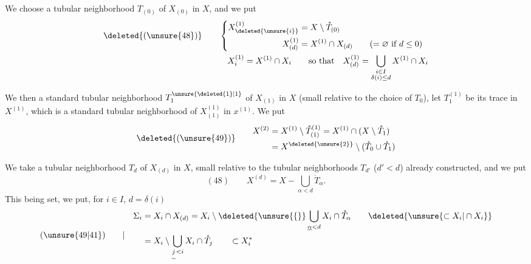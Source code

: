 We choose a  tubular neighborhood $T_{(0)}$ of
$X_{(0)}$ in $X$, and we put
\[
\begin{aligned}
\deleted{(\unsure{48})}\qquad&
\left\{\begin{aligned}
X^{(1)}_{\deleted{\unsure{i}}}&=X\setminus\mathring T_{(0)}\\
X^{(1)}_{(d)}&=X^{(1)}\cap X_{(d)}\qquad(=\varnothing\text{ if }d\leq0)
\end{aligned}\right.\\
&\quad X^{(1)}_i=X^{(1)}\cap X_i
\qquad\text{so that}\quad
X^{(1)}_{(d)}=\bigcup_{\substack{i\in I\\\delta(i)\leq d}}X^{(1)}\cap X_i
\end{aligned}
\]

We then  a standard tubular neighborhood
 $T_1^{\unsure{\deleted{1}|1}}$ of $X_{(1)}$ in $X$
(small relative to the choice of $T_0$), let $T_1^{(1)}$ be its trace in
$X^{(1)}$, which is a standard tubular neighborhood of $X^{(1)}_{(1)}$ in
$x^{(1)}$. We put
\[
\deleted{(\unsure{49})}\qquad
\begin{aligned}
X^{(2)}&=X^{(1)}\setminus\mathring T^{(1)}_{(1)}
=X^{(1)}\cap(X\setminus\mathring T_1)\\
&=X^{\deleted{\unsure{2}}}\setminus(\mathring T_0\cup\mathring T_1)
\end{aligned}
\]

We take a tubular neighborhood $T_d$ of $X_{(d)}$ in $X$,
small relative to the tubular neighborhoods $T_{d'}$ ($d'<d$) already constructed,
and we put
\[
(48)\qquad X^{(d)}=X-\bigcup_{\alpha<d}\mathring T_\alpha.
\]
This being set, we put, for $i\in I$, $d=\delta(i)$
\[
(\unsure{49|41})\qquad|\quad
\begin{aligned}
\Sigma_i&=X_i\cap X_{(d)}
=X_i\setminus\deleted{\unsure{\{}}\bigcup_{\underline{\alpha}<d}X_i\cap
\mathring T_\alpha
\qquad\deleted{\unsure{\subset X_i|\cap X_i}}\\
&=X_i\setminus\bigcup_{\underset{\sim}{j}<i}X_i\cap\mathring T_j
\qquad\subset X_i^*
\end{aligned}
\]

